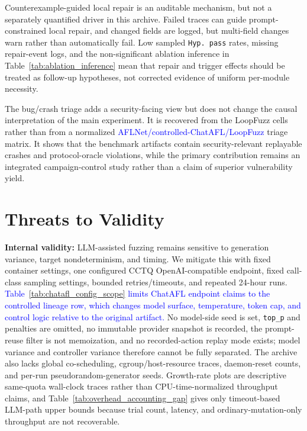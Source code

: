 \documentclass[final,5p,times,number]{elsarticle}
\begin{document}
Counterexample-guided local repair is an auditable mechanism, but not a separately quantified driver in this archive. Failed traces can guide prompt-constrained local repair, and changed fields are logged, but multi-field changes warn rather than automatically fail. Low sampled \texttt{Hyp. pass} rates, missing repair-event logs, and the non-significant ablation inference in Table~\ref{tab:ablation_inference} mean that repair and trigger effects should be treated as follow-up hypotheses, not corrected evidence of uniform per-module necessity.

The bug/crash triage adds a security-facing view but does not change the causal interpretation of the main experiment. It is recovered from the LoopFuzz cells rather than from a normalized \textcolor{blue}{AFLNet/controlled-ChatAFL/LoopFuzz} triage matrix. It shows that the benchmark artifacts contain security-relevant replayable crashes and protocol-oracle violations, while the primary contribution remains an integrated campaign-control study rather than a claim of superior vulnerability yield.

\section{Threats to Validity}
\label{sec:threats}

\textbf{Internal validity:} LLM-assisted fuzzing remains sensitive to generation variance, target nondeterminism, and timing. We mitigate this with fixed container settings, one configured CCTQ OpenAI-compatible endpoint, fixed call-class sampling settings, bounded retries/timeouts, and repeated 24-hour runs. \textcolor{blue}{Table~\ref{tab:chatafl_config_scope} limits ChatAFL endpoint claims to the controlled lineage row, which changes model surface, temperature, token cap, and control logic relative to the original artifact.} No model-side seed is set, \texttt{top\_p} and penalties are omitted, no immutable provider snapshot is recorded, the prompt-reuse filter is not memoization, and no recorded-action replay mode exists; model variance and controller variance therefore cannot be fully separated. The archive also lacks global co-scheduling, cgroup/host-resource traces, daemon-reset counts, and per-run pseudorandom-generator seeds. Growth-rate plots are descriptive same-quota wall-clock traces rather than CPU-time-normalized throughput claims, and Table~\ref{tab:overhead_accounting_gap} gives only timeout-based LLM-path upper bounds because trial count, latency, and ordinary-mutation-only throughput are not recoverable.
\end{document}
